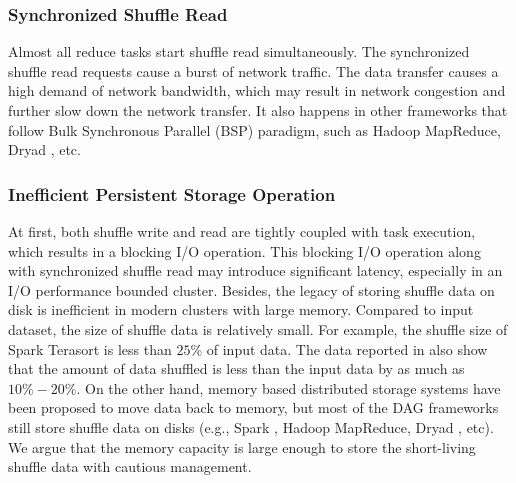 \subsubsection{Synchronized Shuffle Read}
Almost all reduce tasks start shuffle read simultaneously. 
The synchronized shuffle read requests cause a burst of network traffic. 
The data transfer causes a high demand of network bandwidth, which may result in network congestion and further slow down the network transfer.
It also happens in other frameworks that follow Bulk Synchronous Parallel (BSP) paradigm, such as Hadoop MapReduce, Dryad \cite{dryad}, etc.

\subsubsection{Inefficient Persistent Storage Operation}
At first, both shuffle write and read are tightly coupled with task execution, which results in a blocking I/O operation. 
This blocking I/O operation along with synchronized shuffle read may introduce significant latency, especially in an I/O performance bounded cluster.
Besides, the legacy of storing shuffle data on disk is inefficient in modern clusters with large memory. 
Compared to input dataset, the size of shuffle data is relatively small. 
For example, the shuffle size of Spark Terasort is less than $25\%$ of input data. 
The data reported in \cite{makingsense} also show that the amount of data shuffled is less than the input data by as much as $10\%-20\%$. 
On the other hand, memory based distributed storage systems have been proposed \cite{memcached, tachyon, ramcloud} to move data back to memory, 
but most of the DAG frameworks still store shuffle data on disks (e.g., Spark \cite{apachespark}, Hadoop MapReduce, Dryad \cite{dryad}, etc).
We argue that the memory capacity is large enough to store the short-living shuffle data with cautious management.

